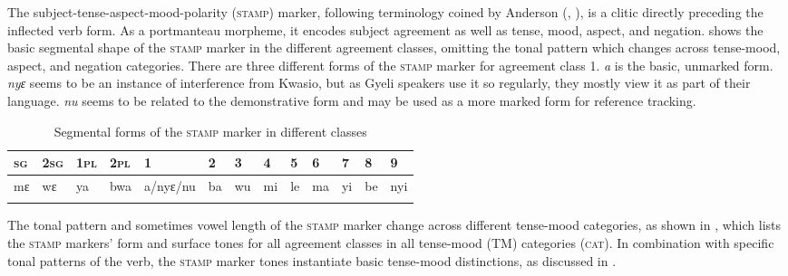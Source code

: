 The subject-tense-aspect-mood-polarity (\textsc{stamp}) marker, following terminology coined by Anderson (\citeyear{anderson2011b}, \citeyear{anderson2015}), is a clitic directly preceding the inflected verb form. As a portmanteau morpheme, it encodes subject agreement as well as tense, mood, aspect, and negation.  shows the basic segmental shape of the \textsc{stamp} marker in the different agreement classes, omitting the tonal pattern which changes across tense-mood, aspect, and negation categories. There are three different forms of the \textsc{stamp} marker for agreement class 1. {\itshape a} is the basic, unmarked form. {\itshape nyɛ} seems to be an instance of interference from Kwasio, but as Gyeli speakers use it so regularly, they mostly view it as part of their language. {\itshape nu} seems to be related to the demonstrative form and may be used as a more marked form for reference tracking. 


\begin{table}
\small
\begin{tabular}{ ll ll p{.6cm}llllllll}
 \lsptoprule
 1\textsc{sg} & 2\textsc{sg} & 1\textsc{pl} & 2\textsc{pl} & 1 & 2 & 3 & 4 & 5 & 6 & 7 & 8 & 9 \\
 \midrule
 mɛ  & wɛ & ya & bwa & a{\slash}nyɛ{\slash}nu & ba & wu & mi & le & ma & yi & be & nyi  \\
 \lspbottomrule
\end{tabular}

\caption{Segmental forms of the \textsc{stamp} marker in different {\AGR} classes}
\label{Tab:SCOPAGR1}
\end{table}

The tonal pattern and sometimes vowel length of the \textsc{stamp} marker change across different tense-mood categories, as shown in , which lists the \textsc{stamp} markers' form and surface tones for all agreement classes in all tense-mood (\textsc{TM}) categories (\textsc{cat}). In combination with specific tonal patterns of the verb, the \textsc{stamp} marker tones instantiate basic tense-mood distinctions, as discussed in .


